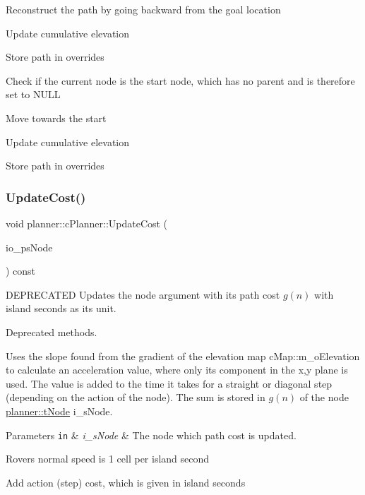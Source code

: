 Reconstruct the path by going backward from the goal location

Update cumulative elevation

Store path in overrides

Check if the current node is the start node, which has no parent and is therefore set to N\+U\+LL

Move towards the start

Update cumulative elevation

Store path in overrides \mbox{\label{classplanner_1_1c_planner_a16e8c156297fff49a6ba9b97073baffb}} 
\subsubsection{\texorpdfstring{Update\+Cost()}{UpdateCost()}}
{\footnotesize\ttfamily void planner\+::c\+Planner\+::\+Update\+Cost (\begin{DoxyParamCaption}\item[{std\+::shared\+\_\+ptr$<$ \mbox{\hyperlink{structplanner_1_1t_node}{t\+Node}} $>$}]{io\+\_\+ps\+Node }\end{DoxyParamCaption}) const}



D\+E\+P\+R\+E\+C\+A\+T\+ED Updates the node argument with its path cost $g(n)$ with island seconds as its unit. 

Deprecated methods.

Uses the slope found from the gradient of the elevation map c\+Map\+::m\+\_\+o\+Elevation to calculate an acceleration value, where only its component in the x,y plane is used. The value is added to the time it takes for a straight or diagonal step (depending on the action of the node). The sum is stored in $g(n)$ of the node \mbox{\hyperlink{structplanner_1_1t_node}{planner\+::t\+Node}} i\+\_\+s\+Node. 
\begin{DoxyParams}[1]{Parameters}
\mbox{\tt in}  & {\em i\+\_\+s\+Node} & The node which path cost is updated. \\
\hline
\end{DoxyParams}
Rover\textquotesingle{}s normal speed is 1 cell per island second

Add action (step) cost, which is given in island seconds \mbox{\label{classplanner_1_1c_planner_ab7cc7c2666de2e49f745901080aac147}} 
